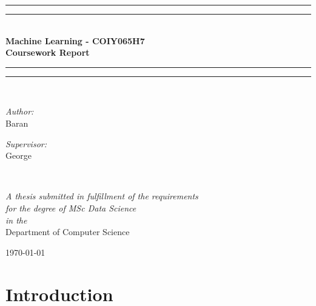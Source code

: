 \documentclass{article}
\begin{document}
\begin{titlepage}
    \begin{center}
        \vspace*{.06\textheight}{\scshape\LARGE Birkbeck, University of London\par}\vspace{1.5cm} %
        \rule[0.5ex]{\linewidth}{2pt}\vspace*{-\baselineskip}\vspace*{3.2pt}
        \rule[0.5ex]{\linewidth}{1pt}\\[\baselineskip]
        \huge{\bfseries Machine Learning - COIY065H7\\Coursework Report}\\[4mm]
        \rule[0.5ex]{\linewidth}{1pt}\vspace*{-\baselineskip}\vspace{3.2pt}
        \rule[0.5ex]{\linewidth}{2pt}\\
        [1.5cm]


            \begin{minipage}[t]{0.4\textwidth}
            \begin{flushleft} \large
            \emph{Author:}\\
            {Baran} %
            \end{flushleft}
            \end{minipage}
            \begin{minipage}[t]{0.4\textwidth}
            \begin{flushright} \large
            \emph{Supervisor:} \\
            {George} %
            \end{flushright}
            \end{minipage}\\
            [3cm]

            \vfill

            \large \textit{A thesis submitted in fulfillment of the requirements\\ for the degree of MSc Data Science}\\[0.3cm] %
            \textit{in the}\\[0.4cm]
            Department of Computer Science\\[2cm] %
 
            \vfill

            {\large \today}\\[4cm] %
 
            \vfill
    \end{center}
\end{titlepage}    

\section{Introduction}
\end{document}
